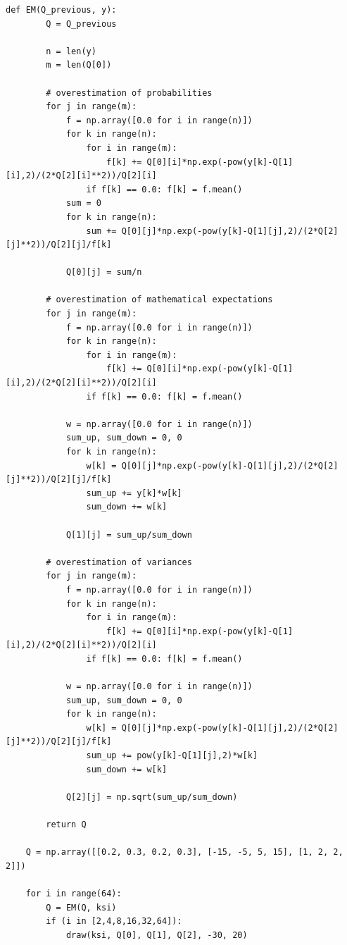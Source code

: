 \documentclass[a4paper,14pt]{extarticle} %
\numberwithin{equation}{section}
\begin{document}
\begin{lstlisting}[firstnumber=1, label = code: EM, caption = Узагальнена функція ЕМ-алгоритму]
    def EM(Q_previous, y):
        Q = Q_previous

        n = len(y)
        m = len(Q[0])

        # overestimation of probabilities
        for j in range(m):
            f = np.array([0.0 for i in range(n)])
            for k in range(n):
                for i in range(m):    
                    f[k] += Q[0][i]*np.exp(-pow(y[k]-Q[1][i],2)/(2*Q[2][i]**2))/Q[2][i]
                if f[k] == 0.0: f[k] = f.mean()
            sum = 0
            for k in range(n):
                sum += Q[0][j]*np.exp(-pow(y[k]-Q[1][j],2)/(2*Q[2][j]**2))/Q[2][j]/f[k]

            Q[0][j] = sum/n

        # overestimation of mathematical expectations
        for j in range(m):
            f = np.array([0.0 for i in range(n)])
            for k in range(n):
                for i in range(m):    
                    f[k] += Q[0][i]*np.exp(-pow(y[k]-Q[1][i],2)/(2*Q[2][i]**2))/Q[2][i]
                if f[k] == 0.0: f[k] = f.mean()
            
            w = np.array([0.0 for i in range(n)])
            sum_up, sum_down = 0, 0
            for k in range(n):
                w[k] = Q[0][j]*np.exp(-pow(y[k]-Q[1][j],2)/(2*Q[2][j]**2))/Q[2][j]/f[k]
                sum_up += y[k]*w[k]
                sum_down += w[k]

            Q[1][j] = sum_up/sum_down

        # overestimation of variances
        for j in range(m):
            f = np.array([0.0 for i in range(n)])
            for k in range(n):
                for i in range(m):    
                    f[k] += Q[0][i]*np.exp(-pow(y[k]-Q[1][i],2)/(2*Q[2][i]**2))/Q[2][i]
                if f[k] == 0.0: f[k] = f.mean()
            
            w = np.array([0.0 for i in range(n)])
            sum_up, sum_down = 0, 0
            for k in range(n):
                w[k] = Q[0][j]*np.exp(-pow(y[k]-Q[1][j],2)/(2*Q[2][j]**2))/Q[2][j]/f[k]
                sum_up += pow(y[k]-Q[1][j],2)*w[k]
                sum_down += w[k]

            Q[2][j] = np.sqrt(sum_up/sum_down)

        return Q

    Q = np.array([[0.2, 0.3, 0.2, 0.3], [-15, -5, 5, 15], [1, 2, 2, 2]])
    
    for i in range(64):
        Q = EM(Q, ksi)
        if (i in [2,4,8,16,32,64]):
            draw(ksi, Q[0], Q[1], Q[2], -30, 20)
\end{lstlisting}
\end{document}
